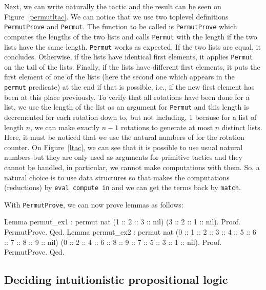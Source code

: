 Next, we can write naturally the tactic and the result can be seen on
Figure~\ref{permutltac}. We can notice that we use two toplevel
definitions {\tt PermutProve} and {\tt Permut}. The function to be
called is {\tt PermutProve} which computes the lengths of the two
lists and calls {\tt Permut} with the length if the two lists have the
same length. {\tt Permut} works as expected.  If the two lists are
equal, it concludes. Otherwise, if the lists have identical first
elements, it applies {\tt Permut} on the tail of the lists.  Finally,
if the lists have different first elements, it puts the first element
of one of the lists (here the second one which appears in the {\tt
  permut} predicate) at the end if that is possible, i.e., if the new
first element has been at this place previously. To verify that all
rotations have been done for a list, we use the length of the list as
an argument for {\tt Permut} and this length is decremented for each
rotation down to, but not including, 1 because for a list of length
$n$, we can make exactly $n-1$ rotations to generate at most $n$
distinct lists. Here, it must be noticed that we use the natural
numbers of {\Coq} for the rotation counter. On Figure~\ref{ltac}, we
can see that it is possible to use usual natural numbers but they are
only used as arguments for primitive tactics and they cannot be
handled, in particular, we cannot make computations with them. So, a
natural choice is to use {\Coq} data structures so that {\Coq} makes
the computations (reductions) by {\tt eval compute in} and we can get
the terms back by {\tt match}.
 
With {\tt PermutProve}, we can now prove lemmas as 
follows:

\begin{coq_example*}
Lemma permut_ex1 :
  permut nat (1 :: 2 :: 3 :: nil) (3 :: 2 :: 1 :: nil).
Proof. PermutProve. Qed.
Lemma permut_ex2 :
  permut nat
    (0 :: 1 :: 2 :: 3 :: 4 :: 5 :: 6 :: 7 :: 8 :: 9 :: nil)
    (0 :: 2 :: 4 :: 6 :: 8 :: 9 :: 7 :: 5 :: 3 :: 1 :: nil).
Proof. PermutProve. Qed.
\end{coq_example*}


\subsection{Deciding intuitionistic propositional logic}

